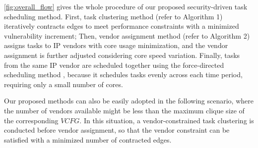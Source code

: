 \documentclass[10pt,journal, compsoc]{IEEEtran}
\begin{document}
\color{blue}

\cref{fig:overall_flow} gives the whole procedure of our proposed security-driven task scheduling method. First, task clustering method (refer to Algorithm 1) iteratively contracts edges to meet performance constraints with a minimized vulnerability increment; Then, vendor assignment method (refer to Algorithm 2) assigns tasks to IP vendors with core usage minimization, and the vendor assignment is further adjusted considering core speed variation. Finally, tasks from the same IP vendor are scheduled together using the force-directed scheduling method \cite{article:PP}, because it schedules tasks evenly across each time period, requiring only a small number of cores.


\color{black}

Our proposed methods can also be easily adopted in the following scenario, where the number of vendors available might be less than the maximum clique size of the corresponding $VCFG$. In this situation, a vendor-constrained task clustering \cite{article:NW} is conducted before vendor assignment, so that the vendor constraint can be satisfied with a minimized number of contracted edges.%
\end{document}
